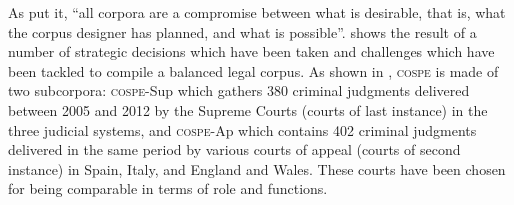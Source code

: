 \documentclass[output=paper]{LSP/langsci}
\begin{document}
As \citet[156--157]{Hunston2008} put it, “all corpora are a compromise between what is desirable, that is, what the corpus designer has planned, and what is possible”.  shows the result of a number of strategic decisions which have been taken and challenges which have been tackled to compile a balanced legal corpus. As shown in , \textsc{cospe} is made of two subcorpora: \textsc{cospe}-\textsc{S}up which gathers 380 criminal judgments delivered between 2005 and 2012 by the Supreme Courts (courts of last instance) in the three judicial systems, and \textsc{cospe}-\textsc{A}p which contains 402 criminal judgments delivered in the same period by various courts of appeal (courts of second instance) in Spain, Italy, and England and Wales. These courts have been chosen for being comparable in terms of role and functions.
\end{document}
